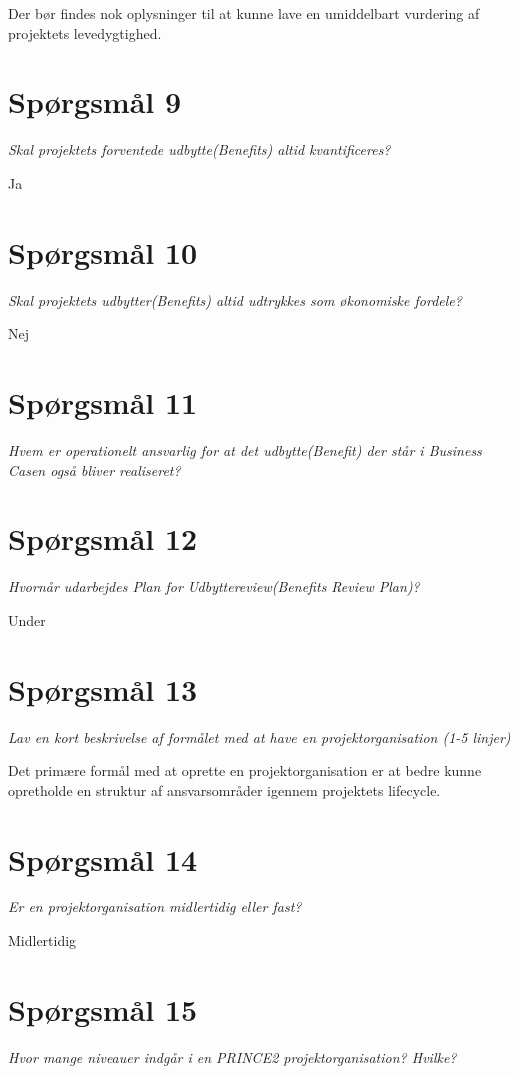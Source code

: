 Der bør findes nok oplysninger til at kunne lave en umiddelbart vurdering af projektets levedygtighed.

\section{Spørgsmål 9}
\textit{Skal projektets forventede udbytte(Benefits) altid kvantificeres?}

Ja

\section{Spørgsmål 10}
\textit{Skal projektets udbytter(Benefits) altid udtrykkes som økonomiske fordele?}

Nej

\section{Spørgsmål 11}
\textit{Hvem er operationelt ansvarlig for at det udbytte(Benefit) der står i Business Casen også bliver realiseret?}


\section{Spørgsmål 12}
\textit{Hvornår udarbejdes Plan for Udbyttereview(Benefits Review Plan)?}

Under 

\section{Spørgsmål 13}
\textit{Lav en kort beskrivelse af formålet med at have en projektorganisation (1-5 linjer)}

Det primære formål med at oprette en projektorganisation er at bedre kunne opretholde en struktur af ansvarsområder igennem projektets lifecycle.

\section{Spørgsmål 14}
\textit{Er en projektorganisation midlertidig eller fast?}

Midlertidig

\section{Spørgsmål 15}
\textit{Hvor mange niveauer indgår i en PRINCE2 projektorganisation? Hvilke?}

